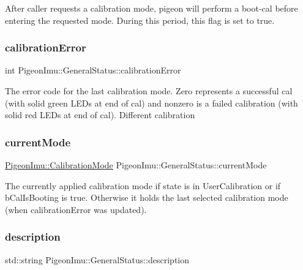 After caller requests a calibration mode, pigeon will perform a boot-\/cal before entering the requested mode. During this period, this flag is set to true. \mbox{\label{struct_pigeon_imu_1_1_general_status_a1f603e10aba28f68f1f50d8f6fa17d5c}} 
\subsubsection{\texorpdfstring{calibration\+Error}{calibrationError}}
{\footnotesize\ttfamily int Pigeon\+Imu\+::\+General\+Status\+::calibration\+Error}

The error code for the last calibration mode. Zero represents a successful cal (with solid green L\+E\+Ds at end of cal) and nonzero is a failed calibration (with solid red L\+E\+Ds at end of cal). Different calibration \mbox{\label{struct_pigeon_imu_1_1_general_status_ac18aec7b326be9680375293dbc26bac8}} 
\subsubsection{\texorpdfstring{current\+Mode}{currentMode}}
{\footnotesize\ttfamily \hyperlink{class_pigeon_imu_a1d73ea84ad5c812e809698fab0b9b490}{Pigeon\+Imu\+::\+Calibration\+Mode} Pigeon\+Imu\+::\+General\+Status\+::current\+Mode}

The currently applied calibration mode if state is in User\+Calibration or if b\+Cal\+Is\+Booting is true. Otherwise it holds the last selected calibration mode (when calibration\+Error was updated). \mbox{\label{struct_pigeon_imu_1_1_general_status_a146df77af7a6c0a7f622009dfd0ce5b7}} 
\subsubsection{\texorpdfstring{description}{description}}
{\footnotesize\ttfamily std\+::string Pigeon\+Imu\+::\+General\+Status\+::description}

